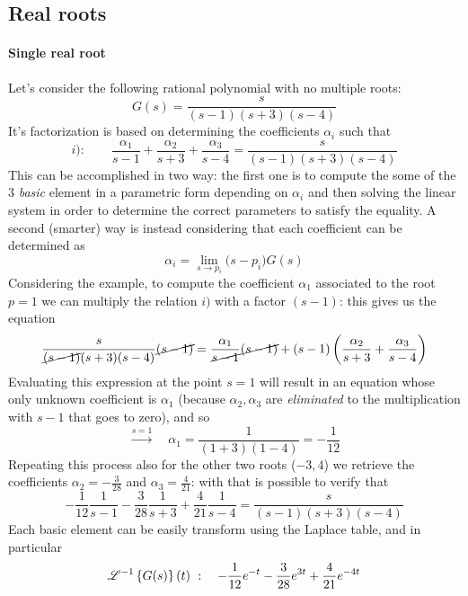 \subsection{Real roots}
	\paragraph{Single real root} Let's consider the following rational polynomial with no multiple roots:
	\[ G(s) = \frac{s}{(s-1)(s+3)(s-4)} \]
	It's factorization is based on determining the coefficients $\alpha_i$ such that
	\[ i): \qquad \frac{\alpha_1}{s-1} + \frac{\alpha_2}{s+3} + \frac{\alpha_3}{s-4} = \frac{s}{(s-1)(s+3)(s-4)} \]
	This can be accomplished in two way: the first one is to compute the some of the 3 \textit{basic} element in a parametric form depending on $\alpha_i$ and then solving the linear system in order to determine the correct parameters to satisfy the equality. A second (smarter) way is instead considering that each coefficient can be determined as
	\[ \alpha_i = \lim_{s\rightarrow p_i} \big(s-p_i\big) G(s) \]
	Considering the example, to compute the coefficient $\alpha_1$ associated to the root $p = 1$ we can multiply the relation $i)$ with a factor $(s-1)$: this gives us the equation
	\[ \frac{s}{\cancel{(s-1)}(s+3)(s-4)} \cancel{(s-1)}= \frac{\alpha_1}{\cancel{s-1}} \cancel{(s-1)} + {(s-1) \left( \frac{\alpha_2}{s+3} + \frac{\alpha_3}{s-4} \right)}  \]
	Evaluating this expression at the point $s=1$ will result in an equation whose only unknown coefficient is $\alpha_1$ (because $\alpha_2,\alpha_3$ are \textit{eliminated} to the multiplication with $s-1$ that goes to zero), and so
	\[\xrightarrow{s=1} \quad \alpha_1 = \frac{1}{(1+3)(1-4)} = -\frac 1 {12} \]
	Repeating this process also for the other two roots ($-3,4$) we retrieve the coefficients $\alpha_2 = -\frac 3 {28}$ and $\alpha_3 = \frac 4 {21}$: with that is possible to verify that
	\[ -\frac 1 {12} \frac 1 {s-1} - \frac 3 {28} \frac 1 {s+3} + \frac 4 {21} \frac{1}{s-4} = \frac{s}{(s-1)(s+3)(s-4)} \]
	Each basic element can be easily transform using the Laplace table, and in particular
	\[ \mathscr{L}^{-1} \left\{ G(s) \right\}(t) \ : \quad -\frac 1 {12} e^{-t} - \frac 3{28} e^{3t} + \frac 4 {21} e^{-4t} \]
	
